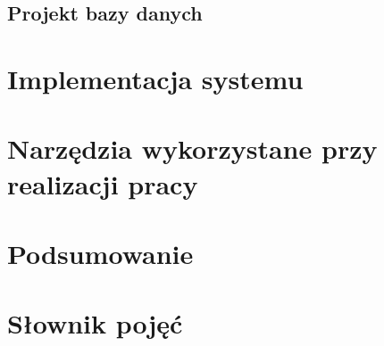 \subsection{Projekt bazy danych}

\section{Implementacja systemu}

\section{Narzędzia wykorzystane przy realizacji pracy}

\section*{Podsumowanie}

\section*{Słownik pojęć}
